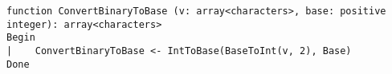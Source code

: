 \begin{lstlisting}[breaklines]
function ConvertBinaryToBase (v: array<characters>, base: positive integer): array<characters>
Begin
|    ConvertBinaryToBase <- IntToBase(BaseToInt(v, 2), Base)
Done
\end{lstlisting}
